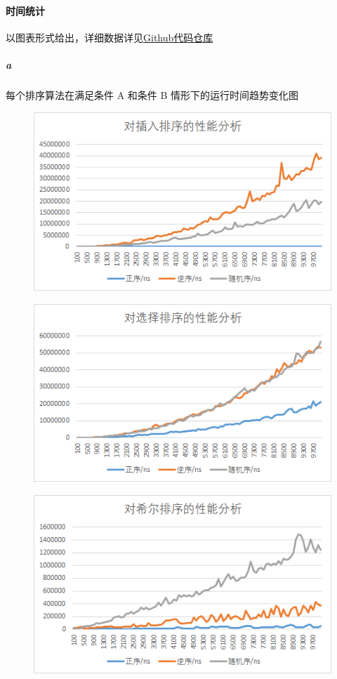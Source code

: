 \documentclass[UTF8]{ctexart}
\begin{document}
    \paragraph{时间统计} 以图表形式给出，详细数据详见\href{https://github.com/sylxjtu/datastructure-homework/blob/master/homework1/data/out.txt}{Github代码仓库}
      \subparagraph{a} 每个排序算法在满足条件 A 和条件 B 情形下的运行时间趋势变化图
        \begin{figure}[H]
          \includegraphics[width=\textwidth]{insertionsort}
          \centering
        \end{figure}
        \begin{figure}[H]
          \includegraphics[width=\textwidth]{selectionsort}
          \centering
        \end{figure}
        \begin{figure}[H]
          \includegraphics[width=\textwidth]{shellsort}
          \centering
        \end{figure}
\end{document}
